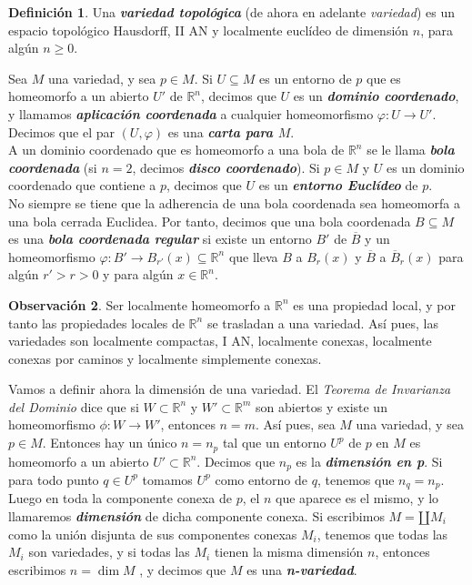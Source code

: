 \documentclass[10pt]{report}
\newcommand{\R}{\mathbb{R}}
\DeclareMathOperator{\dimension}{dim} %
\newcommand{\enfatiza}[1]{\textbf{\textit{#1}}}
\theoremstyle{definition}
\newtheorem{defin}{Definición}[section]
\newtheorem{obs}[defin]{Observación}
\begin{document}
\begin{defin}\label{def:variedad}%
Una \textbf{\emph{variedad topológica}} (de ahora en adelante \emph{variedad}) es un espacio topológico Hausdorff, II AN y localmente euclídeo de dimensión $n$, para algún $n\geq 0$.
\end{defin}
Sea $M$ una variedad, y sea $p\in M$. Si $U\subseteq M$ es un entorno de $p$ que es homeomorfo a un abierto $U'$ de $\R^n$, decimos que $U$ es un \enfatiza{dominio coordenado}, y llamamos \enfatiza{aplicación coordenada} a cualquier homeomorfismo $\varphi :U\to U'$. Decimos que el par $(U,\varphi )$ es una \enfatiza{carta para $M$}.\\
A un dominio coordenado que es homeomorfo a una bola de $\R^n$ se le llama \enfatiza{bola coordenada} (si $n=2$, decimos \enfatiza{disco coordenado}). Si $p\in M$ y $U$ es un dominio coordenado que contiene a $p$, decimos que $U$ es un \enfatiza{entorno Euclídeo} de $p$.\\
No siempre se tiene que la adherencia de una bola coordenada sea homeomorfa a una bola cerrada Euclidea. Por tanto, decimos que una bola coordenada $B\subseteq M$ es una \enfatiza{bola coordenada regular} si existe un entorno $B'$ de $\overline{B}$ y un homeomorfismo $\varphi:B'\to B_{r'}(x)\subseteq \R^n$ que lleva $B$ a $B_r(x)$ y $\overline{B}$ a $\overline{B}_r(x)$ para algún $r'>r>0$ y para algún $x\in \R^n$.
\begin{obs}%
Ser localmente homeomorfo a $\R^n$ es una propiedad local, y por tanto las propiedades locales de $\R^n$ se trasladan a una variedad. Así pues, las variedades son localmente compactas, I AN, localmente conexas, localmente conexas por caminos y localmente simplemente conexas.
\end{obs}
Vamos a definir ahora la dimensión de una variedad. El \textit{Teorema de Invarianza del Dominio} dice que si $W\subset \R^n$ y $W'\subset \R^m$ son abiertos y existe un homeomorfismo $\phi: W \rightarrow W'$, entonces $n=m$. Así pues, sea $M$ una variedad, y sea $p\in M$. Entonces hay un único $n=n_p$ tal que un entorno $U^p$ de $p$ en $M$ es homeomorfo a un abierto $U'\subset \R^n$. Decimos que $n_p$ es la \enfatiza{dimensión en p}. Si para todo punto $q\in U^p$ tomamos $U^p$ como entorno de $q$, tenemos que $n_q=n_p$. Luego en toda la componente conexa de $p$, el $n$ que aparece es el mismo, y lo llamaremos \enfatiza{dimensión} de dicha componente conexa. Si escribimos $M=\amalg M_i$ como la unión disjunta de sus componentes conexas $M_i$, tenemos que todas las $M_i$ son variedades, y si todas las $M_i$ tienen la misma dimensión $n$, entonces escribimos $n=\dimension{M}$ , y decimos que $M$ es una \enfatiza{n-variedad}.\\
\end{document}
